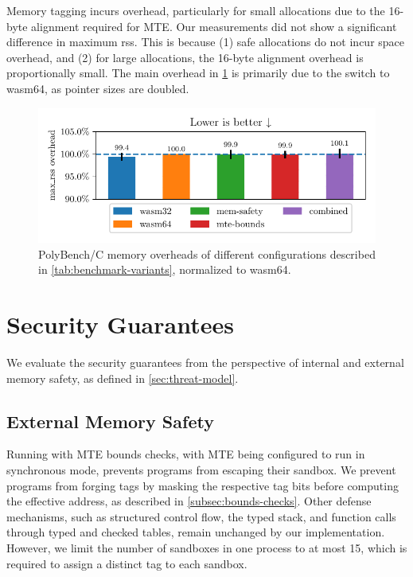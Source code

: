 Memory tagging incurs overhead, particularly for small allocations due to the 16-byte alignment required for \ac{MTE}.
Our measurements did not show a significant difference in maximum \ac{rss}.
This is because (1) safe allocations do not incur space overhead, and (2) for large allocations, the 16-byte alignment overhead is proportionally small.
The main overhead in \cref{fig:memory-overheads} is primarily due to the switch to wasm64, as pointer sizes are doubled.

\begin{figure}[t]
    \centering
    \includegraphics{plots/mem-overhead}
    \caption{PolyBench/C memory overheads of different configurations described in \cref{tab:benchmark-variants}, normalized to wasm64.}
    \label{fig:memory-overheads}
\end{figure}


\section{Security Guarantees}\label{sec:security-guarantees}

We evaluate the security guarantees from the perspective of internal and external memory safety, as defined in \cref{sec:threat-model}.

\subsection{External Memory Safety}
\label{subsec:sec-guarantees-external-memory-safety}

Running with \ac{MTE} bounds checks, with \ac{MTE} being configured to run in synchronous mode, prevents programs from escaping their sandbox.
We prevent programs from forging tags by masking the respective tag bits before computing the effective address, as described in \cref{subsec:bounds-checks}.
Other defense mechanisms, such as structured control flow, the typed stack, and function calls through typed and checked tables, remain unchanged by our implementation.
However, we limit the number of sandboxes in one process to at most 15, which is required to assign a distinct tag to each sandbox.

